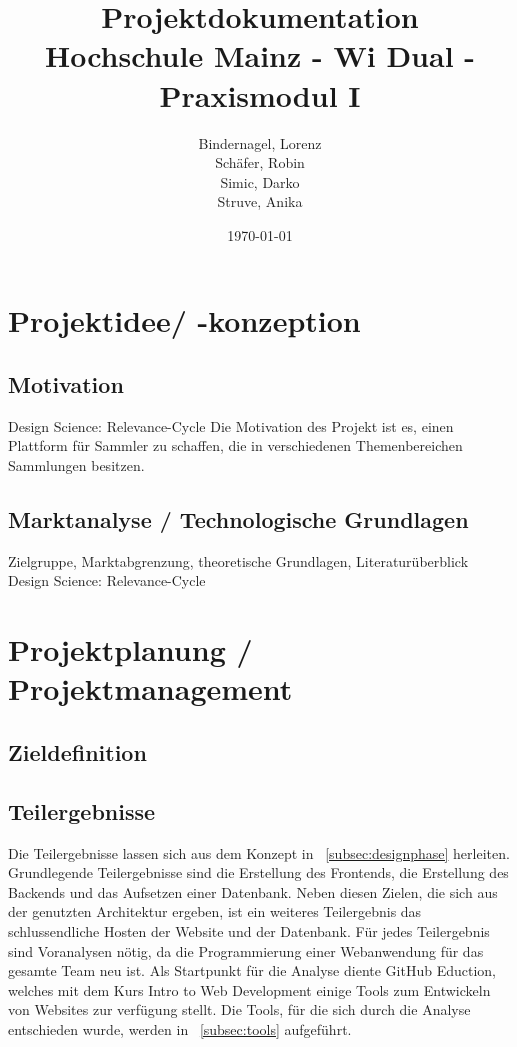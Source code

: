 \documentclass[a4paper, 12pt]{article}
\title{
    Projektdokumentation\\
    Hochschule Mainz - Wi Dual - Praxismodul I
}
\author{
    Bindernagel, Lorenz\\
    Schäfer, Robin\\
    Simic, Darko\\
    Struve, Anika
}
\date{
    \today
}
\begin{document}
    \maketitle
    \tableofcontents
    \newpage

    \section{Projektidee/ -konzeption}
    
    \subsection{Motivation}
    Design Science: Relevance-Cycle
    Die Motivation des Projekt ist es, einen Plattform für Sammler zu schaffen, die in verschiedenen Themenbereichen Sammlungen besitzen.


    \subsection{Marktanalyse / Technologische Grundlagen}
    Zielgruppe, Marktabgrenzung, theoretische Grundlagen, Literaturüberblick\linebreak
    Design Science: Relevance-Cycle

    \newpage

    \section{Projektplanung / Projektmanagement}
    
    \subsection{Zieldefinition}

    \subsection{Teilergebnisse}
    Die Teilergebnisse lassen sich aus dem Konzept in ~\ref{subsec:designphase} herleiten.
    Grundlegende Teilergebnisse sind die Erstellung des Frontends, die Erstellung des Backends und das Aufsetzen einer Datenbank.
    Neben diesen Zielen, die sich aus der genutzten Architektur ergeben, ist ein weiteres Teilergebnis das schlussendliche Hosten der Website und der Datenbank.
    Für jedes Teilergebnis sind Voranalysen nötig, da die Programmierung einer Webanwendung für das gesamte Team neu ist.
    Als Startpunkt für die Analyse diente GitHub Eduction, welches mit dem Kurs Intro to Web Development einige Tools zum Entwickeln von Websites zur verfügung stellt.
    Die Tools, für die sich durch die Analyse entschieden wurde, werden in ~\ref{subsec:tools} aufgeführt.
\end{document}

